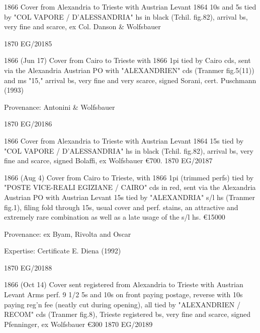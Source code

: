 \documentclass[justified]{tufte-book}
\begin{document}
%
{1866 Cover from Alexandria to Trieste with Austrian Levant 1864 10s and 5s tied by "COL VAPORE / D'ALESSANDRIA" hs in black (Tchil. fig.82), arrival bs, very fine and scarce, ex Col. Danson \& Wolfsbauer

 }%
{1870}%
{EG/20185}%
{}%
{}
{}%
{}

%
{1866 (Jun 17) Cover from Cairo to Trieste with 1866 1pi tied by Cairo cds, sent via the Alexandria Austrian PO with "ALEXANDRIEN" cds (Tranmer fig.5(11)) and ms "15," arrival bs, very fine and very scarce, signed Sorani, cert. Puschmann (1993)

Provenance: Antonini \& Wolfsbauer

 }%
{1870}%
{EG/20186}%
{}%
{}
{}%
{}

%
{1866 Cover from Alexandria to Trieste with Austrian Levant 1864 15s tied by "COL VAPORE / D'ALESSANDRIA" hs in black (Tchil. fig.82), arrival bs, very fine and scarce, signed Bolaffi, ex Wolfsbauer
\euro 700.
 }%
{1870}%
{EG/20187}%
{}%
{}
{}%
{}

%
{1866 (Aug 4) Cover from Cairo to Trieste, with 1866 1pi (trimmed perfs) tied by "POSTE VICE-REALI EGIZIANE / CAIRO" cds in red, sent via the Alexandria Austrian PO with Austrian Levant 15s tied by "ALEXANDRIA" s/l hs (Tranmer fig.1), filing fold through 15s, usual cover and perf. stains, an attractive and extremely rare combination as well as a late usage of the s/l hs. \euro 15000

Provenance: ex Byam, Rivolta and Oscar

Expertise: Certificate E. Diena (1992)
 }%
{1870}%
{EG/20188}%
{}%
{}
{}%
{}


%
{1866 (Oct 14) Cover sent registered from Alexandria to Trieste with Austrian Levant Arms perf. 9 1/2 5s and 10s on front paying postage, reverse with 10s paying reg'n fee (neatly cut during opening), all tied by "ALEXANDRIEN / RECOM" cds (Tranmer fig.8), Trieste registered bs, very fine and scarce, signed Pfenninger, ex Wolfsbauer
\euro 300
 }%
{1870}%
{EG/20189}%
{}%
{}
{}%
{}
\end{document}
